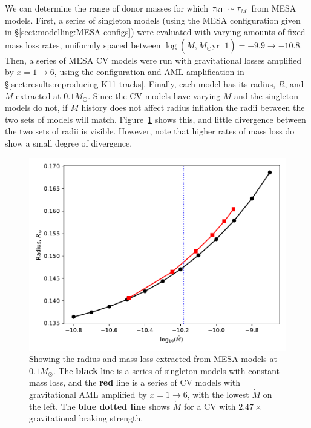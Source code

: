 We can determine the range of donor masses for which $\tau_{\rm KH} \sim \tau_{\dot M}$ from MESA models.
First, a series of singleton models (using the MESA configuration given in \S\ref{sect:modelling:MESA configs}) were evaluated with varying amounts of fixed mass loss rates, uniformly spaced between $\log (\dot M, M_\odot \mathrm{yr}^-1) = -9.9 \rightarrow -10.8$.
Then, a series of MESA CV models were run with gravitational losses amplified by $x = 1 \rightarrow 6$, using the configuration and AML amplification in \S\ref{sect:results:reproducing K11 tracks}.
Finally, each model has its radius, $R$, and $\dot M$ extracted at $0.1 M_\odot$. Since the CV models have varying $\dot M$ and the singleton models do not, if $\dot M$ history does not affect radius inflation the radii between the two sets of models will match. Figure~\ref{fig:results:comparing radii at 0.1Msun} shows this, and little divergence between the two sets of radii is visible. However, note that higher rates of mass loss do show a small degree of divergence.
\begin{figure}
    \centering
    \includegraphics[width=.8\textwidth]{figures/modelling/compare_0.1Msun_with_CV_track_K11_fig1.pdf}
    \caption{Showing the radius and mass loss extracted from MESA models at $0.1 M_\odot$. The {\bf black} line is a series of singleton models with constant mass loss, and the {\bf red} line is a series of CV models with gravitational AML amplified by $x = 1 \rightarrow 6$, with the lowest $\dot M$ on the left. The {\bf blue dotted line} shows $\dot M$ for a CV with $2.47\times$ gravitational braking strength.}
    \label{fig:results:comparing radii at 0.1Msun}
\end{figure}

